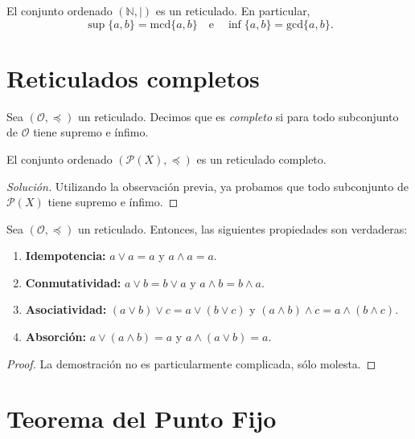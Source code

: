 \begin{example}
	El conjunto ordenado $(\mathbb{N},\mid)$ es un reticulado. En particular,
	\begin{equation*}
		\sup \{ a, b \} = \mathrm{mcd}\{ a, b \} \quad \text{e} \quad \inf \{ a, b \} = \mathrm{gcd}\{ a, b \}.
	\end{equation*}
\end{example}

\section{Reticulados completos}

\begin{definition}
	Sea $(\mathcal{O}, \preceq)$ un reticulado. Decimos que es \emph{completo} si para todo subconjunto de $\mathcal{O}$ tiene supremo e ínfimo.
\end{definition}

\begin{example}
	El conjunto ordenado $(\mathcal{P}(X), \preceq)$ es un reticulado completo.
\end{example}

\begin{proof}[Solución]
	Utilizando la observación previa, ya probamos que todo subconjunto de $\mathcal{P}(X)$ tiene supremo e ínfimo.
\end{proof}

\begin{proposition}
	Sea $(\mathcal{O}, \preceq)$ un reticulado. Entonces, las siguientes propiedades son verdaderas:
	\begin{enumerate}
		\item \textbf{Idempotencia:} $a \vee a = a$ y $a \wedge a = a$.
		\item \textbf{Conmutatividad:} $a \vee b = b \vee a$ y $a \wedge b = b \wedge a$.
		\item \textbf{Asociatividad:} $(a \vee b) \vee c = a \vee (b \vee c)$ y $(a \wedge b) \wedge c = a \wedge (b \wedge c)$.
		\item \textbf{Absorción:} $a \vee (a \wedge b) = a$ y $a \wedge (a \vee b) = a$.
	\end{enumerate}
\end{proposition}

\begin{proof}
	La demostración no es particularmente complicada, sólo molesta.
\end{proof}

\section{Teorema del Punto Fijo}

